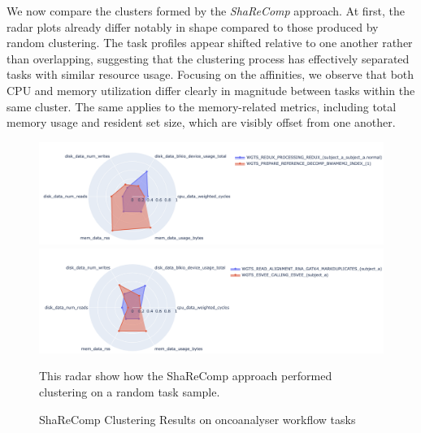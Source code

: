 We now compare the clusters formed by the \textit{ShaReComp} approach. At first, the radar plots already differ notably in shape compared to those produced by random clustering. The task profiles appear shifted relative to one another rather than overlapping, suggesting that the clustering process has effectively separated tasks with similar resource usage. Focusing on the affinities, we observe that both CPU and memory utilization differ clearly in magnitude between tasks within the same cluster. The same applies to the memory-related metrics, including total memory usage and resident set size, which are visibly offset from one another.

\begin{figure}[H]
    \centering
    \includegraphics[scale=0.45]{fig/06/06-radarplot-cluster.png}
    \includegraphics[scale=0.45]{fig/06/06-radarplot-cluster-2.png}
    \small
    \caption{ShaReComp Clustering Results on oncoanalyser workflow tasks}
    \label{fig:radarplot_cluster}
    \tiny
    This radar show how the ShaReComp approach performed clustering on a random task sample.
\end{figure}

